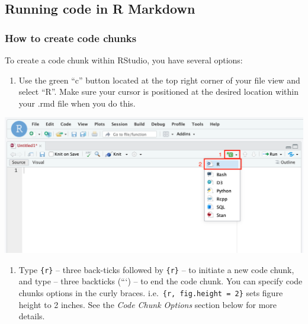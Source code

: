 \documentclass[
]{book}
\providecommand{\tightlist}{%
  \setlength{\itemsep}{0pt}\setlength{\parskip}{0pt}}
\begin{document}
\hypertarget{running-code-in-r-markdown}{%
\subsection{Running code in R Markdown}\label{running-code-in-r-markdown}}

\hypertarget{how-to-create-code-chunks}{%
\subsubsection{How to create code chunks}\label{how-to-create-code-chunks}}

To create a code chunk within RStudio, you have several options:

\begin{enumerate}
\def\labelenumi{\arabic{enumi}.}
\tightlist
\item
  Use the green ``c'' button located at the top right corner of your file view and select ``R''. Make sure your cursor is positioned at the desired location within your .rmd file when you do this.
\end{enumerate}

\includegraphics{images/rmd_codeblock_1.png}

\begin{enumerate}
\def\labelenumi{\arabic{enumi}.}
\setcounter{enumi}{1}
\tightlist
\item
  Type \texttt{\textasciigrave{}\textasciigrave{}\textasciigrave{}\{r\}} -- three back-ticks followed by \texttt{\{r\}} -- to initiate a new code chunk, and type \texttt{\textasciigrave{}\textasciigrave{}\textasciigrave{}} -- three backticks (```) -- to end the code chunk. You can specify code chunks options in the curly braces. i.e.~\texttt{\textasciigrave{}\textasciigrave{}\textasciigrave{}\{r,\ fig.height\ =\ 2\}} sets figure height to 2 inches. See the \emph{Code Chunk Options} section below for more details.
\end{enumerate}
\end{document}
